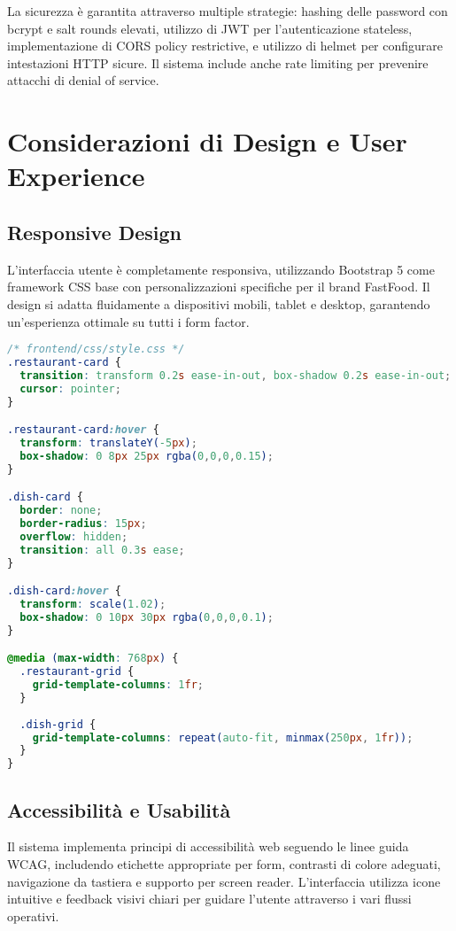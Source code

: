 \documentclass[12pt,a4paper]{article}
\begin{document}
La sicurezza è garantita attraverso multiple strategie: hashing delle password con bcrypt e salt rounds elevati, utilizzo di JWT per l'autenticazione stateless, implementazione di CORS policy restrictive, e utilizzo di helmet per configurare intestazioni HTTP sicure. Il sistema include anche rate limiting per prevenire attacchi di denial of service.

\section{Considerazioni di Design e User Experience}

\subsection{Responsive Design}

L'interfaccia utente è completamente responsiva, utilizzando Bootstrap 5 come framework CSS base con personalizzazioni specifiche per il brand FastFood. Il design si adatta fluidamente a dispositivi mobili, tablet e desktop, garantendo un'esperienza ottimale su tutti i form factor.

\begin{lstlisting}[language=CSS, caption=Stili personalizzati responsivi]
/* frontend/css/style.css */
.restaurant-card {
  transition: transform 0.2s ease-in-out, box-shadow 0.2s ease-in-out;
  cursor: pointer;
}

.restaurant-card:hover {
  transform: translateY(-5px);
  box-shadow: 0 8px 25px rgba(0,0,0,0.15);
}

.dish-card {
  border: none;
  border-radius: 15px;
  overflow: hidden;
  transition: all 0.3s ease;
}

.dish-card:hover {
  transform: scale(1.02);
  box-shadow: 0 10px 30px rgba(0,0,0,0.1);
}

@media (max-width: 768px) {
  .restaurant-grid {
    grid-template-columns: 1fr;
  }
  
  .dish-grid {
    grid-template-columns: repeat(auto-fit, minmax(250px, 1fr));
  }
}
\end{lstlisting}

\subsection{Accessibilità e Usabilità}

Il sistema implementa principi di accessibilità web seguendo le linee guida WCAG, includendo etichette appropriate per form, contrasti di colore adeguati, navigazione da tastiera e supporto per screen reader. L'interfaccia utilizza icone intuitive e feedback visivi chiari per guidare l'utente attraverso i vari flussi operativi.
\end{document}
